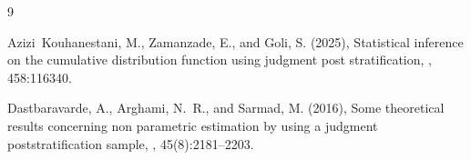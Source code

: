\documentclass[twoside]{article}
\begin{document}
\begin{thebibliography}{9}

%

Azizi~Kouhanestani, M., Zamanzade, E., and Goli, S. (2025),
\newblock Statistical inference on the cumulative distribution function using
  judgment post stratification,
, 458:116340.


%
%

Dastbaravarde, A., Arghami, N.~R., and Sarmad, M. (2016),
\newblock Some theoretical results concerning non parametric estimation by
  using a judgment poststratification sample,
,
  45(8):2181--2203.


\end{thebibliography}
\end{document}
